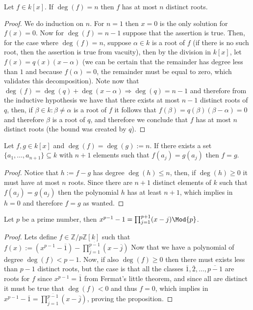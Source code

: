 \begin{lemma}
   Let \(f \in k[x]\). If \(\deg(f) = n\) then \(f\) has at most \(n\) distinct
   roots.
\end{lemma}

\begin{proof}
   We do induction on \(n\). For \(n = 1\) then \(x = 0\) is the only solution
   for \(f(x) = 0\). Now for \(\deg(f) = n-1\) suppose that the assertion is
   true. Then, for the case where \(\deg(f) = n\), suppose \(\alpha \in k\) is a
   root of \(f\) (if there is no such root, then the assertion is true from
   vacuity), then by the division in \(k[x]\), let  \(f(x) = q(x)(x-\alpha)\)
   (we can be certain that the remainder has degree less than \(1\) and because
   \(f(\alpha) = 0\), the remainder must be equal to zero, which validates this
   decomposition). Note now that \(\deg(f) = \deg(q) + \deg(x-\alpha)
   \Rightarrow \deg(q) = n-1\) and therefore from the inductive hypothesis we
   have that there exists at most \(n-1\) distinct roots of \(q\), then, if
   \(\beta \in k : \beta \neq \alpha\) is a root of \(f\) it follows that
   \(f(\beta) = q(\beta)(\beta - \alpha) = 0\) and therefore \(\beta\) is a root
   of \(q\), and therefore we conclude that \(f\) has at most \(n\) distinct
   roots (the bound was created by \(q\)).
\end{proof}

\begin{corollary}
   Let \(f, g \in k[x]\) and \(\deg(f) = \deg(g) := n\). If there exists a set
   \(\{a_1, \dots, a_{n+1}\} \subseteq k\) with \(n+1\) elements such that
   \(f(a_j) = g(a_j)\) then \(f = g\).
\end{corollary}

\begin{proof}
   Notice that \(h := f - g\) has degree \(\deg(h) \leqslant n\), then, if
   \(\deg(h) \geqslant 0\) it must have at most \(n\) roots. Since there are
   \(n+1\) distinct elements of \(k\) such that \(f(a_j) = g(a_j)\) then the
   polynomial \(h\) has at least \(n+1\), which implies in \(h = 0\) and
   therefore \(f = g\) as wanted.
\end{proof}

\begin{proposition}
   Let \(p\) be a prime number, then  \(x^{p-1} - 1 = \prod_{j=1}^{p+1} (x - j)
   \Mod{p}\).
\end{proposition}

\begin{proof}
   Lets define \(f \in \mathbb{Z}/p\mathbb{Z}[k]\) such that \(f(x) := (x^{p-1}
   - \overline{1}) - \prod_{\overline{j} = 1}^{\overline{p-1}}(x-\overline{j})\)
   Now that we have a polynomial of degree \(\deg(f) < p-1\). Now, if also
   \(\deg(f) \geqslant 0\) then there must exists less than \(p-1\) distinct
   roots, but the case is that all the classes \(\overline{1},
   \overline{2},\dots, \overline{p-1}\) are roots for \(f\) since \(x^{p-1} =
   \overline{1}\) from Fermat's little theorem, and since all are distinct it
   must be true that \(\deg(f) < 0\) and thus \(f = 0\), which implies in
   \(x^{p-1} - \overline{1} = \prod_{\overline{j}=1}^{\overline{p-1}} (x -
   \overline{j})\), proving the proposition.
\end{proof}

